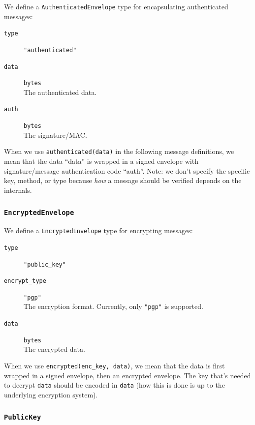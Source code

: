 \documentclass[pdftex,12pt,a4papaer,twoside,notitlepage]{report}
\begin{document}
\begin{appendices}
We define a \texttt{AuthenticatedEnvelope} type for encapsulating authenticated messages:

\begin{leftbar}
\begin{description}
\item[\texttt{type}] \verb="authenticated"=
\item[\texttt{data}] \texttt{bytes} \\
  The authenticated data.
\item[\texttt{auth}] \texttt{bytes} \\
  The signature/MAC.
\end{description}
\end{leftbar}

When we use \verb=authenticated(data)= in the following message definitions, we
mean that the data ``data'' is wrapped in a signed envelope with
signature/message authentication code ``auth''. Note: we don't specify the
specific key, method, or type because \emph{how} a message should be verified
depends on the internals.

\subsubsection{\texttt{EncryptedEnvelope}}

We define a \texttt{EncryptedEnvelope} type for encrypting messages:
\begin{leftbar}
\begin{description}
\item[\texttt{type}] \verb="public_key"=
\item[\texttt{encrypt\_type}] \verb="pgp"= \\
  The encryption format. Currently, only \verb="pgp"= is supported.
\item[\texttt{data}] \texttt{bytes} \\
  The encrypted data.
\end{description}
\end{leftbar}

When we use \verb=encrypted(enc_key, data)=, we mean that the data is first
wrapped in a signed envelope, then an encrypted envelope. The key that's needed
to decrypt \texttt{data} should be encoded in \texttt{data} (how this is done is
up to the underlying encryption system).

\subsubsection{\texttt{PublicKey}}


\end{appendices}
\end{document}
